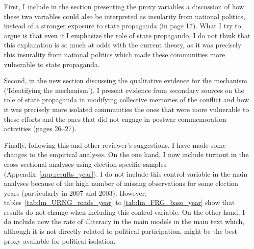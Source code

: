 \documentclass[12pt, a4paper, notitlepage]{article}
\begin{document}
First, I include in the section presenting the proxy variables a discussion of how these two variables could also be interpreted as insularity from national politics, instead of a stronger exposure to state propaganda (in page 17). What I try to argue is that even if I emphasize the role of state propagando, I do not think that this explanation is so much at odds with the current theory, as it was precisely this insurality from national politics which made these communities more vulnerable to state propaganda.

Second, in the new section discussing the qualitative evidence for the mechanism (`Identifying the mechanism'), I present evidence from secondary sources on the role of state propaganda in modifying collective memories of the conflict and how it was precisely more isolated communities the ones that were more vulnerable to these efforts and the ones that did not engage in postwar commemoration activities (pages 26--27).

Finally, following this and other reviewer's suggestions, I have made some changes to the empirical analyses. On the one hand, I now include turnout in the cross-sectional analyses using election-specific samples (Appendix~\ref{app:results_year}). I do not include this control variable in the main analyses because of the high number of missing observations for some election years (particularly in 2007 and 2003). However, tables~\ref{tab:lm_URNG_roads_year} to \ref{tab:lm_FRG_base_year} show that results do not change when including this control variable.
On the other hand, I do include now the rate of illiteracy in the main models in the main text which, although it is not directly related to political participation, might be the best proxy available for political isolation.
\end{document}
